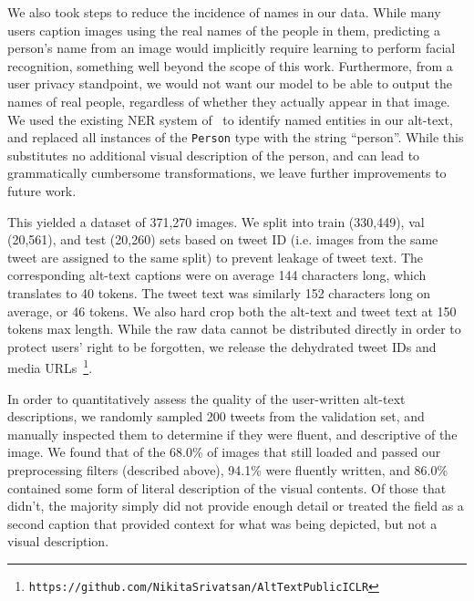 \documentclass{article} %
\begin{document}
We also took steps to reduce the incidence of names in our data.
While many users caption images using the real names of the people in them, predicting a person's name from an image would implicitly require learning to perform facial recognition, something well beyond the scope of this work.
Furthermore, from a user privacy standpoint, we would not want our model to be able to output the names of real people, regardless of whether they actually appear in that image.
We used the existing NER system of~\citet{NER1,NER2} to identify named entities in our alt-text, and replaced all instances of the \texttt{Person} type with the string ``person''.
While this substitutes no additional visual description of the person, and can lead to grammatically cumbersome transformations, we leave further improvements to future work.

This yielded a dataset of 371,270 images.
We split into train (330,449), val (20,561), and test (20,260) sets based on tweet ID (i.e. images from the same tweet are assigned to the same split) to prevent leakage of tweet text.
The corresponding alt-text captions were on average 144 characters long, which translates to 40 tokens.
The tweet text was similarly 152 characters long on average, or 46 tokens.
We also hard crop both the alt-text and tweet text at 150 tokens max length.
While the raw data cannot be distributed directly in order to protect users' right to be forgotten, we release the dehydrated tweet IDs and media URLs~\footnote{\texttt{https://github.com/NikitaSrivatsan/AltTextPublicICLR}}.

In order to quantitatively assess the quality of the user-written alt-text descriptions, we randomly sampled 200 tweets from the validation set, and manually inspected them to determine if they were fluent, and descriptive of the image.
We found that of the 68.0\% of images that still loaded and passed our preprocessing filters (described above), 94.1\% were fluently written, and 86.0\% contained some form of literal description of the visual contents.
Of those that didn't, the majority simply did not provide enough detail or treated the field as a second caption that provided context for what was being depicted, but not a visual description.
\end{document}
